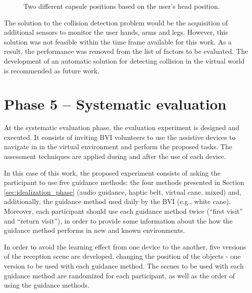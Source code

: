 \begin{figure}[!htb]
\begin{minipage}{0.45\textwidth}
                \label{fig:user_looking_down}
            \end{minipage}
            \caption{Two different capsule positions based on the user's head position.}
            \label{fig:user_envelope}
        \end{figure}

        The solution to the collision detection problem would be the acquisition of additional sensors to monitor the user hands, arms and legs. However, this solution was not feasible within the time frame available for this work. As a result, the performance was removed from the list of factors to be evaluated. The development of an automatic solution for detecting collision in the virtual world is recommended as future work.

\section{Phase 5 – Systematic evaluation}
\label{sec:experiment}

        
At the systematic evaluation phase, the evaluation experiment is designed and executed. It consists of inviting BVI volunteers to use the assistive devices to navigate in in the virtual environment and perform the proposed tasks. The assessment techniques are applied during and after the use of each device.

In this case of this work, the proposed experiment consists of asking the participant to use five guidance methods: the four methods presented in Section \ref{sec:idealization_phase} (audio guidance, haptic belt, virtual cane, mixed) and, additionally, the guidance method used daily by the BVI (e.g., white cane). Moreover, each participant should use each guidance method twice (“first visit” and “return visit”), in order to provide some information about the how the guidance method performs in new and known environments.

In order to avoid the learning effect from one device to the another, five versions of the reception scene are developed, changing the position of the objects - one version to be used with each guidance method. The scenes to be used with each guidance method are randomized for each participant, as well as the order of using the guidance methods.

